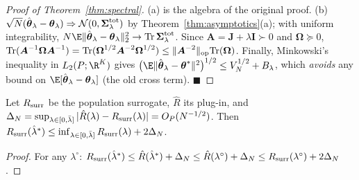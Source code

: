 \begin{proof}[Proof of Theorem~\ref{thm:spectral}]
(a) is the algebra of the original proof. (b) $\sqrt N(\hat{\boldsymbol\theta}_\lambda-\boldsymbol\theta_\lambda)\Rightarrow\mathcal N(0,\boldsymbol\Sigma_\lambda^{\rm tot})$ by Theorem~\ref{thm:asymptotics}(a);
with uniform integrability, $N\E\|\hat{\boldsymbol\theta}_\lambda-\boldsymbol\theta_\lambda\|_2^2\to\mathrm{Tr}\,\boldsymbol\Sigma^{\rm tot}_\lambda$. Since $\boldsymbol A=\boldsymbol J+\lambda\boldsymbol I\succ0$ and $\boldsymbol\Omega\succeq0$,
$\mathrm{Tr}(\boldsymbol A^{-1}\boldsymbol\Omega\boldsymbol A^{-1})=\mathrm{Tr}(\boldsymbol\Omega^{1/2}\boldsymbol A^{-2}\boldsymbol\Omega^{1/2})\le\|\boldsymbol A^{-2}\|_{\rm op}\mathrm{Tr}(\boldsymbol\Omega)$.
Finally, Minkowski's inequality in $L_2(P;\R^K)$ gives $\big(\E\|\hat{\boldsymbol\theta}_\lambda-\boldsymbol\theta^*\|^2\big)^{1/2}\le V_N^{1/2}+B_\lambda$, which \emph{avoids} any bound on
$\E[\hat{\boldsymbol\theta}_\lambda-\boldsymbol\theta_\lambda]$ (the old cross term). $\blacksquare$
\end{proof}

\begin{lemma}
Let $R_{\rm surr}$ be the population surrogate, $\hat R$ its plug-in, and $\Delta_N=\sup_{\lambda\in[0,\bar\lambda]}|\hat R(\lambda)-R_{\rm surr}(\lambda)|=O_P(N^{-1/2})$.
Then $R_{\rm surr}(\hat\lambda^*)\le\inf_{\lambda\in[0,\bar\lambda]}R_{\rm surr}(\lambda)+2\Delta_N$.
\end{lemma}
\begin{proof}
For any $\lambda^\circ$: $R_{\rm surr}(\hat\lambda^*)\le\hat R(\hat\lambda^*)+\Delta_N\le\hat R(\lambda^\circ)+\Delta_N\le R_{\rm surr}(\lambda^\circ)+2\Delta_N$.
\end{proof}

